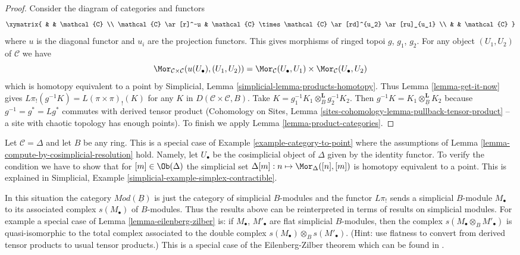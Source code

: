 \begin{proof}
Consider the diagram of categories and functors
$$
\xymatrix{
& & \mathcal{C} \\
\mathcal{C} \ar[r]^-u &
\mathcal{C} \times \mathcal{C} \ar[rd]^{u_2} \ar[ru]_{u_1} \\
& & \mathcal{C}
}
$$
where $u$ is the diagonal functor and $u_i$ are the projection functors.
This gives morphisms of ringed topoi $g$, $g_1$, $g_2$.
For any object $(U_1, U_2)$ of $\mathcal{C}$ we have
$$
\Mor_{\mathcal{C} \times \mathcal{C}}(u(U_\bullet), (U_1, U_2)) =
\Mor_\mathcal{C}(U_\bullet, U_1) \times \Mor_\mathcal{C}(U_\bullet, U_2)
$$
which is homotopy equivalent to a point by
Simplicial, Lemma \ref{simplicial-lemma-products-homotopy}.
Thus Lemma \ref{lemma-get-it-now} gives
$L\pi_!(g^{-1}K) = L(\pi \times \pi)_!(K)$ for any $K$ in
$D(\mathcal{C} \times \mathcal{C}, B)$.
Take $K = g_1^{-1}K_1 \otimes_B^\mathbf{L} g_2^{-1}K_2$.
Then $g^{-1}K = K_1 \otimes^\mathbf{L}_{\underline{B}} K_2$
because $g^{-1} = g^* = Lg^*$ commutes with derived tensor product
(Cohomology on Sites, Lemma
\ref{sites-cohomology-lemma-pullback-tensor-product}
-- a site with chaotic topology has enough points).
To finish we apply Lemma \ref{lemma-product-categories}.
\end{proof}

\begin{remark}
\label{remark-simplicial-modules}
Let $\mathcal{C} = \Delta$ and let $B$ be any ring. This is a special
case of Example \ref{example-category-to-point} where the assumptions
of Lemma \ref{lemma-compute-by-cosimplicial-resolution} hold.
Namely, let $U_\bullet$ be the cosimplicial object of $\Delta$ given by
the identity functor. To verify the condition we have to show that for
$[m] \in \Ob(\Delta)$ the simplicial set
$\Delta[m] : n \mapsto \Mor_\Delta([n], [m])$ is homotopy equivalent
to a point. This is explained in
Simplicial, Example \ref{simplicial-example-simplex-contractible}.

\medskip\noindent
In this situation the category $\textit{Mod}(\underline{B})$
is just the category of simplicial $B$-modules and the
functor $L\pi_!$ sends a simplicial $B$-module $M_\bullet$ to its associated
complex $s(M_\bullet)$ of $B$-modules. Thus the results above can be
reinterpreted in terms of results on simplicial modules. For example
a special case of Lemma \ref{lemma-eilenberg-zilber} is:
if $M_\bullet$, $M'_\bullet$ are flat simplicial
$B$-modules, then the complex $s(M_\bullet \otimes_B M'_\bullet)$ is
quasi-isomorphic to the total complex associated to the double complex
$s(M_\bullet) \otimes_B s(M'_\bullet)$.
(Hint: use flatness to convert from derived tensor products to usual
tensor products.)
This is a special case of the Eilenberg-Zilber theorem
which can be found in \cite{Eilenberg-Zilber}.
\end{remark}

